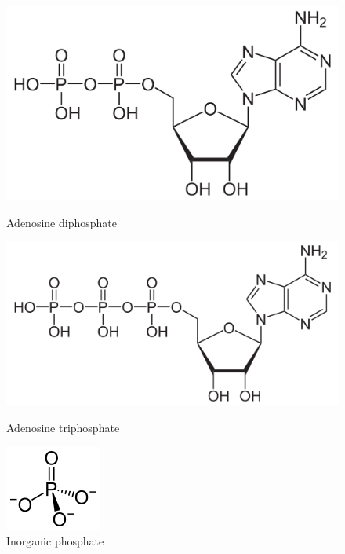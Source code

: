 \documentclass[draft, final]{report}
\begin{document}
\begin{itemize}
  \begin{figure}[!ht]
      \begin{minipage}[c]{.46\linewidth}
          \centering
          \includegraphics[scale=0.15]{LateX/Images/AdenosineDiphosphate.png}
          \caption{Adenosine diphosphate\label{AdenosineDiphosphate}}
      \end{minipage}
      \hfill%
      \begin{minipage}[c]{.46\linewidth}
          \centering
          \includegraphics[scale=0.4]{LateX/Images/AdenosineTriphosphate.png}
          \caption{Adenosine triphosphate\label{AdenosineTriphosphate}}
      \end{minipage}
      \hfill%
      \begin{minipage}[c]{.46\linewidth}
          \centering
          \includegraphics[scale=0.5]{LateX/Images/InorganicPhosphate.png}
          \caption{Inorganic phosphate \label{InorganicPhosphate}}

\end{minipage}
\end{figure}
\end{itemize}
\end{document}

